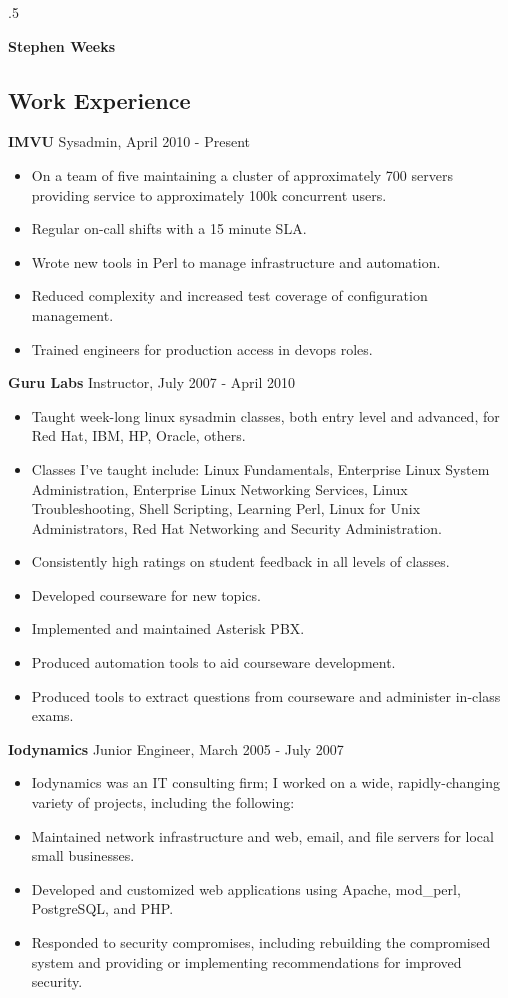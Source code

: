 \documentclass[line]{res}
\begin{document}
\moveleft.5\hoffset\centerline{\Huge\textbf{Stephen Weeks}}

\address{801.634.5859 tene@allalone.org}

\begin{resume}

\section{Work Experience}
\textbf{IMVU} Sysadmin, April 2010 - Present
\begin{itemize}
\item On a team of five maintaining a cluster of approximately 700 servers providing service to approximately 100k concurrent users.
\item Regular on-call shifts with a 15 minute SLA.
\item Wrote new tools in Perl to manage infrastructure and automation.
\item Reduced complexity and increased test coverage of configuration management.
\item Trained engineers for production access in devops roles.
\end{itemize}

\textbf{Guru Labs} Instructor, July 2007 - April 2010
\begin{itemize}
\item Taught week-long linux sysadmin classes, both entry level and advanced, for Red Hat, IBM, HP, Oracle, others.
\item Classes I've taught include: Linux Fundamentals, Enterprise Linux System Administration, Enterprise Linux Networking Services, Linux Troubleshooting, Shell Scripting, Learning Perl, Linux for Unix Administrators, Red Hat Networking and Security Administration.
\item Consistently high ratings on student feedback in all levels of classes.
\item Developed courseware for new topics.
\item Implemented and maintained Asterisk PBX.
\item Produced automation tools to aid courseware development.
\item Produced tools to extract questions from courseware and administer in-class exams.
\end{itemize}

\textbf{Iodynamics} Junior Engineer, March 2005 - July 2007
\begin{itemize}
\item Iodynamics was an IT consulting firm; I worked on a wide, rapidly-changing variety of projects, including the following:
\item Maintained network infrastructure and web, email, and file servers for local small businesses.
\item Developed and customized web applications using Apache, mod\_perl, PostgreSQL, and PHP.
\item Responded to security compromises, including rebuilding the compromised system and providing or implementing recommendations for improved security.
\end{itemize}


\end{resume}
\end{document}
